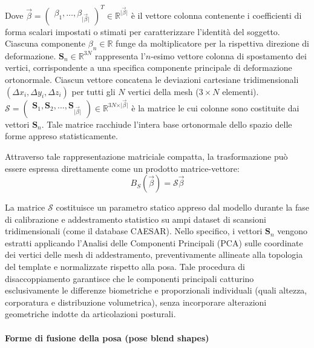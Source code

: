 Dove $\vec{\beta} = \begin{pmatrix} \beta_1, \dots, \beta_{\vert{}\vec{\beta}\vert{}} \end{pmatrix}^T \in \mathbb{R}^{\vert \vec{\beta} \vert}$ è il vettore colonna contenente i coefficienti di forma scalari impostati o stimati per caratterizzare l'identità del soggetto.
Ciascuna componente $\beta_n \in \mathbb{R}$ funge da moltiplicatore per la rispettiva direzione di deformazione.
%
$\mathbf{S}_n \in \mathbb{R}^{3N}$ rappresenta l'$n$-esimo vettore colonna di spostamento dei vertici, corrispondente a una specifica componente principale di deformazione ortonormale.
Ciascun vettore concatena le deviazioni cartesiane tridimensionali $(\Delta x_i, \Delta y_i, \Delta z_i)$ per tutti gli $N$ vertici della mesh ($3 \times N$ elementi).
%
$\mathcal{S} = \begin{pmatrix} \mathbf{S}_1, \mathbf{S}_2, \dots, \mathbf{S}_{\vert \vec{\beta} \vert}\end{pmatrix} \in \mathbb{R}^{3N \times \vert \vec{\beta} \vert}$ è la matrice le cui colonne sono costituite dai vettori $\mathbf{S}_n$.
Tale matrice racchiude l'intera base ortonormale dello spazio delle forme appreso statisticamente.

Attraverso tale rappresentazione matriciale compatta, la trasformazione può essere espressa direttamente come un prodotto matrice-vettore:
\begin{equation}
B_S(\vec{\beta}) = \mathcal{S}\vec{\beta}
\end{equation}

La matrice $\mathcal{S}$ costituisce un parametro statico appreso dal modello durante la fase di calibrazione e addestramento statistico su ampi dataset di scansioni tridimensionali (come il database CAESAR).
Nello specifico, i vettori $\mathbf{S}_n$ vengono estratti applicando l'Analisi delle Componenti Principali (PCA) sulle coordinate dei vertici delle mesh di addestramento, preventivamente allineate alla topologia del template e normalizzate rispetto alla posa.
Tale procedura di disaccoppiamento garantisce che le componenti principali catturino esclusivamente le differenze biometriche e proporzionali individuali (quali altezza, corporatura e distribuzione volumetrica), senza incorporare alterazioni geometriche indotte da articolazioni posturali.



\paragraph{Forme di fusione della posa (pose blend shapes)}

